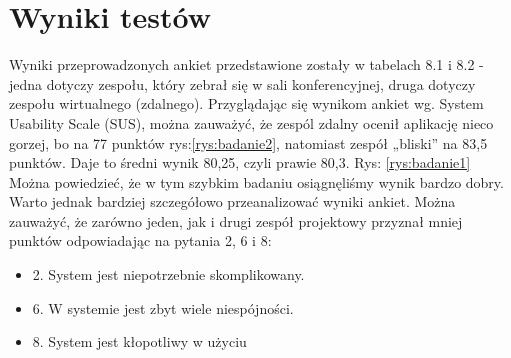 \section{Wyniki testów}
Wyniki przeprowadzonych ankiet przedstawione zostały w tabelach 8.1 i 8.2 - jedna dotyczy zespołu,
który zebrał się w sali konferencyjnej, druga dotyczy zespołu wirtualnego (zdalnego).
Przyglądając się wynikom ankiet wg. System Usability Scale (SUS), można zauważyć, że zespól zdalny
ocenił aplikację nieco gorzej, bo na 77 punktów rys:\ref{rys:badanie2}, natomiast zespół „bliski” na 83,5 punktów. Daje to
średni wynik 80,25, czyli prawie 80,3. Rys: \ref{rys:badanie1}
Można powiedzieć, że w tym szybkim badaniu osiągnęliśmy wynik bardzo dobry. Warto jednak
bardziej szczegółowo przeanalizować wyniki ankiet. Można zauważyć, że zarówno jeden, jak i drugi
zespół projektowy przyznał mniej punktów odpowiadając na pytania 2, 6 i 8:
\begin{itemize}
    \item 2. System jest niepotrzebnie skomplikowany.
    \item 6. W systemie jest zbyt wiele niespójności.
    \item 8. System jest kłopotliwy w użyciu
\end{itemize}
